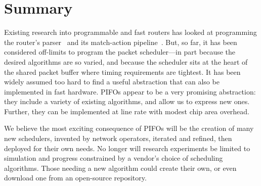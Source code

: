 \section{Summary}
\label{s:pifo_summary}

Existing research into programmable and fast routers has looked at programming
the router's parser~\cite{glen_parsing} and its match-action
pipeline~\cite{rmt}. But, so far, it has been considered
off-limits to program the packet scheduler---in part because the desired
algorithms are so varied, and because the scheduler sits at the heart of the
shared packet buffer where timing requirements are tightest.  It has been
widely assumed too hard to find a useful abstraction that can also be
implemented in fast hardware. PIFOs appear to be a very promising abstraction:
they include a variety of existing algorithms, and allow us to express new
ones. Further, they can be implemented at line rate with modest chip area
overhead.

We believe the most exciting consequence of PIFOs will be the creation of many
new schedulers, invented by network operators, iterated and refined, then
deployed for their own needs. No longer will research experiments be limited to
simulation and progress constrained by a vendor's choice of scheduling
algorithms. Those needing a new algorithm could create their own, or even
download one from an open-source repository.
